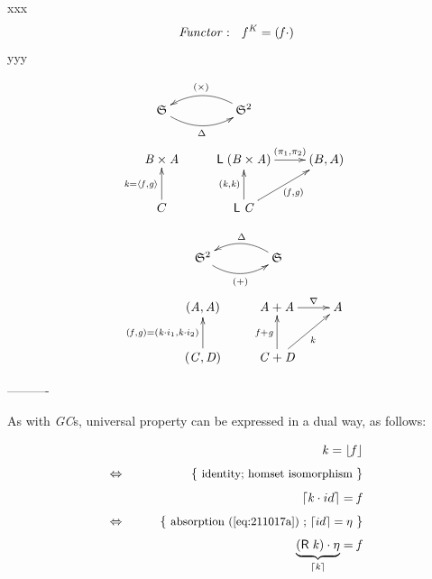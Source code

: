 \documentclass{elsarticle}
\newcommand{\Conid}[1]{\mathit{#1}}
\newcommand{\Varid}[1]{\mathit{#1}}
\def\myxym#1{\vcenter{\xymatrix{#1}}}
\def\comp{ \mathbin{\cdot} }
\def\fun#1{\mathsf{#1}}
\def\just#1#2{\\ &#1& \rule{2em}{0pt} \{ \mbox{\rule[-.7em]{0pt}{1.8em} \small #2 \/} \} \nonumber\\ && }
\def\p#1{\pi_{#1}}
\def\conj#1#2{\mathopen{\langle} #1, #2 \mathclose{\rangle}}
\def\cat#1{{\mathfrak #1}}
\def\start{&&}
\def\equiv{\Leftrightarrow}
\begin{document}

xxx
\begin{eqnarray}
\mbox{ \emph{Functor}}: &&
	\ensuremath{{\Varid{f}}^{\Conid{K}}\mathrel{=}(\Varid{f} \comp )}
\end{eqnarray}
yyy

\begin{eqnarray*}
\myxym{
	\ensuremath{\cat{S}}
		\ar@/_1.0pc/[r]_-{\ensuremath{\Delta }}
&
	\ensuremath{{\cat{S}}^{\mathrm{2}}}
		\ar@/_1.0pc/[l]_-{\ensuremath{( \times )}}
\\
	\ensuremath{\Conid{B} \times \Conid{A}}
&
	\ensuremath{\fun L \;(\Conid{B} \times \Conid{A})}
	\ar[r]^-{\ensuremath{(\p1,\p2)}}
&
	(B,A)
\\
C
	\ar[u]^{\ensuremath{\Varid{k}\mathrel{=}\conj{\Varid{f}}{\Varid{g}}}}
&
	\ensuremath{\fun L \;\Conid{C}}
	\ar[u]^{\ensuremath{(\Varid{k},\Varid{k})}}
	\ar[ru]_{\ensuremath{(\Varid{f},\Varid{g})}}
}
\end{eqnarray*}

\begin{eqnarray*}
\myxym{
	\ensuremath{{\cat{S}}^{\mathrm{2}}}
		\ar@/_1.0pc/[r]_-{\ensuremath{(\mathbin{+})}}
&
	\ensuremath{\cat{S}}
		\ar@/_1.0pc/[l]_-{\ensuremath{\Delta }}
\\
	\ensuremath{(\Conid{A},\Conid{A})}
&
\ensuremath{\Conid{A}\mathbin{+}\Conid{A}}
	\ar[r]^-{\ensuremath{\nabla }}
&
	\ensuremath{\Conid{A}}
\\
	\ensuremath{(\Conid{C},\Conid{D})}
	\ar[u]^{\ensuremath{(\Varid{f},\Varid{g})\mathrel{=}(\Varid{k} \comp i_1,\Varid{k} \comp i_2)}}
&
	\ensuremath{\Conid{C}\mathbin{+}\Conid{D}}
	\ar[u]^{\ensuremath{\Varid{f}\mathbin{+}\Varid{g}}}
	\ar[ru]_{\ensuremath{\Varid{k}}}
}
\end{eqnarray*}

----------


As with \emph{GC}s, universal property can be expressed in a dual way, as follows:

\begin{eqnarray*}
\start
	\ensuremath{\Varid{k}\mathrel{=}\lfloor \Varid{f}\rfloor}
%
\just\equiv{ identity; homset isomorphism }
%
	\ensuremath{\lceil \Varid{k} \comp {id}\rceil\mathrel{=}\Varid{f}}
%
\just\equiv{ absorption (\ref{eq:211017a}) ; \ensuremath{\lceil {id}\rceil\mathrel{=}\eta } }
%
	\ensuremath{\underbrace{(\fun R \;\Varid{k}) \comp \eta }_{\lceil \Varid{k}\rceil}\mathrel{=}\Varid{f}}
\end{eqnarray*}
%
\end{document}
